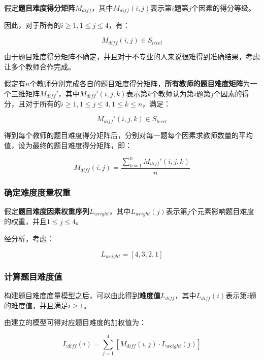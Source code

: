 假定\textbf{题目难度得分矩阵}$M_{diff}$，其中$M_{diff}(i, j)$表示第$i$题第$j$个因素的得分等级。

因此，对于所有的$i \geq 1, 1 \leq j \leq 4$，有：

\begin{equation}
M_{diff}(i, j)\in S_{level}
\end{equation}

由于题目难度得分矩阵不确定，并且对于不专业的人来说很难得到准确结果，考虑让多个教师合作完成。

假定有$n$个教师分别完成各自的题目难度得分矩阵，\textbf{所有教师的题目难度矩阵}为一个三维矩阵$M_{diff}'$，其中$M_{diff}'(i, j, k)$表示第$k$个教师认为第$i$题第$j$个因素的得分，且对于所有的$i \geq 1, 1 \leq j \leq 4, 1 \leq k \leq n$，满足：

\begin{equation}
M_{diff}'(i, j, k)\in S_{level}
\end{equation}

得到每个教师的题目难度得分矩阵后，分别对每一题每个因素求教师数量的平均值，设为最终的题目难度得分矩阵，即：

\begin{equation}
    M_{diff}(i, j) = 
    \frac{
        \sum_{k = 1}^{n}M_{diff}'(i, j, k)
    }{n}
\end{equation}

\subsubsection{确定难度度量权重}

假定\textbf{题目难度因素权重序列}$L_{weight}$，其中$L_{weight}(j)$表示第$j$个元素影响题目难度的权重，并且$1 \leq j \leq 4$。

经分析，考虑：

\begin{equation}
    L_{weight} = [4, 3, 2, 1]
\end{equation}

\subsubsection{计算题目难度值}

构建题目难度度量模型之后，可以由此得到\textbf{难度值}$L_{diff}$，其中$L_{diff}(i)$表示第$i$题的难度值，并且满足$i \geq 1$。

由建立的模型可得对应题目难度的加权值为：

\begin{equation}
    L_{diff}(i) = 
    \sum_{j = 1}^{4} \left [ 
        M_{diff}(i, j) \cdot L_{weight}(j)
    \right ]
\end{equation}

